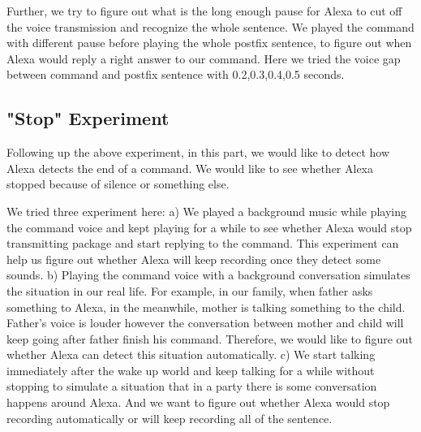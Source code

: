 Further, we try to figure out what is the long enough pause for Alexa to cut off the voice transmission and recognize the whole sentence. We played the command with different pause before playing the whole postfix sentence, to figure out when Alexa would reply a right answer to our command. Here we tried the voice gap between command and postfix sentence with 0.2,0.3,0.4,0.5 seconds.

\subsection{"Stop" Experiment}

Following up the above experiment, in this part, we would like to detect how Alexa detects the end of a command. We would like to see whether Alexa stopped because of silence or something else.

We tried three experiment here: a) We played a background music while playing the command voice and kept playing for a while to see whether Alexa would stop transmitting package and start replying to the command. This experiment can help us figure out whether Alexa will keep recording once they detect some sounds. b) Playing the command voice with a background conversation simulates the situation in our real life. For example, in our family, when father asks something to Alexa, in the meanwhile, mother is talking something to the child. Father's voice is louder however the conversation between mother and child will keep going after father finish his command. Therefore, we would like to figure out whether Alexa can detect this situation automatically. c) We start talking immediately after the wake up world and keep talking for a while without stopping to simulate a situation that in a party there is some conversation happens around Alexa. And we want to figure out whether Alexa would stop recording automatically or will keep recording all of the sentence.


